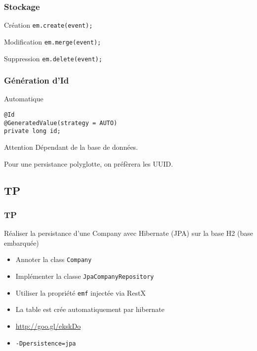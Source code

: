 \documentclass[t,12pt]{beamer}
\begin{document}
\begin{frame}
	\frametitle{Stockage}

	\begin{exampleblock}{Cr\'eation}
		\lstinline{em.create(event);}
	\end{exampleblock}

	\begin{block}{Modification}
		\lstinline{em.merge(event);}
	\end{block}

	\begin{alertblock}{Suppression}
		\lstinline{em.delete(event);}
	\end{alertblock}
\end{frame}

\begin{frame}[fragile]
	\frametitle{G\'en\'eration d'Id}

	\begin{block}{Automatique}
		\begin{lstlisting}[frame=none]
@Id
@GeneratedValue(strategy = AUTO)
private long id;
		\end{lstlisting}
	\end{block}

	\begin{alertblock}{Attention}
		D\'ependant de la base de donn\'ees.

		Pour une persistance polyglotte, on pr\'ef\`erera les UUID.
	\end{alertblock}
\end{frame}

\subsection{TP}

\begin{frame}
	\frametitle{TP}

	\begin{block}{R\'ealiser la persistance d'une Company avec Hibernate (JPA) sur la base H2 (base embarqu\'ee)}
		\begin{itemize}
			\item Annoter la class \lstinline{Company}
			\item Impl\'ementer la classe \lstinline{JpaCompanyRepository}
			\item Utiliser la propri\'et\'e \lstinline{emf} inject\'ee via RestX
			\item La table est cr\'ee automatiquement par hibernate
			\item \url{http://goo.gl/ekskDo}
			\item \lstinline{-Dpersistence=jpa}
		\end{itemize}
	\end{block}
\end{frame}
\end{document}
